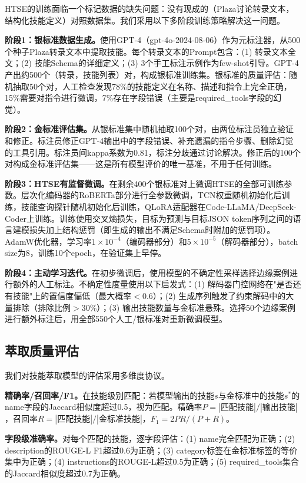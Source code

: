 \documentclass[conference]{IEEEtran}
\begin{document}
HTSE的训练面临一个标记数据的缺失问题：没有现成的（Plaza讨论转录文本，结构化技能定义）对照数据集。我们采用以下多阶段训练策略解决这一问题。

\textbf{阶段1：银标准数据生成。}使用GPT-4（gpt-4o-2024-08-06）作为元标注器，从500个种子Plaza转录文本中提取技能。每个转录文本的Prompt包含：(1) 转录文本全文；(2) 技能Schema的详细定义；(3) 3个手工标注示例作为few-shot引导。GPT-4产出约500个（转录，技能列表）对，构成银标准训练集。银标准的质量评估：随机抽取50个对，人工检查发现78\%的技能定义在名称、描述和指令上完全正确，15\%需要对指令进行微调，7\%存在字段错误（主要是required\_tools字段的幻觉）。

\textbf{阶段2：金标准评估集。}从银标准集中随机抽取100个对，由两位标注员独立验证和修正。标注员修正GPT-4输出中的字段错误、补充遗漏的指令步骤、删除幻觉的工具引用。标注员间kappa系数为0.81，标注分歧通过讨论解决。修正后的100个对构成金标准评估集——这是所有模型评价的唯一基准，不用于任何训练。

\textbf{阶段3：HTSE有监督微调。}在剩余400个银标准对上微调HTSE的全部可训练参数。层次化编码器的RoBERTa部分进行全参数微调，TCN权重随机初始化后训练，技能查询探针随机初始化后训练，QLoRA适配器在Code-LLaMA/DeepSeek-Coder上训练。训练使用交叉熵损失，目标为预测与目标JSON token序列之间的语言建模损失加上结构惩罚（即生成的输出不满足Schema时附加的惩罚项）。AdamW优化器，学习率$1\times10^{-4}$（编码器部分）和$5\times10^{-5}$（解码器部分），batch size为8，训练10个epoch，在验证集上早停。

\textbf{阶段4：主动学习迭代。}在初步微调后，使用模型的不确定性采样选择边缘案例进行额外的人工标注。不确定性度量使用以下启发式：(1) 解码器门控网络在"是否还有技能"上的置信度偏低（最大概率$<0.6$）；(2) 生成序列触发了约束解码中的大量排除（排除比例$>30\%$）；(3) 输出技能数量与金标准悬殊。选择50个边缘案例进行额外标注后，用全部550个人工/银标准对重新微调模型。

\subsection{萃取质量评估}

我们对技能萃取模型的评估采用多维度协议。

\textbf{精确率/召回率/F1。}在技能级别匹配：若模型输出的技能$s$与金标准中的技能$s^*$的name字段的Jaccard相似度超过0.5，视为匹配。精确率$P = |\text{匹配技能}| / |\text{输出技能}|$，召回率$R = |\text{匹配技能}| / |\text{金标准技能}|$，$F_1 = 2PR/(P+R)$。

\textbf{字段级准确率。}对每个匹配的技能，逐字段评估：(1) name完全匹配为正确；(2) description的ROUGE-L F1超过0.6为正确；(3) category标签在金标准标签的等价集中为正确；(4) instructions的ROUGE-L超过0.5为正确；(5) required\_tools集合的Jaccard相似度超过0.7为正确。
\end{document}
